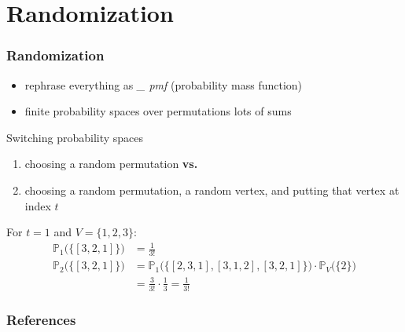 \documentclass{beamer}
\begin{document}

\section{Randomization}
\begin{frame}
  \frametitle{Randomization}
  \begin{itemize}[<+->]
    \item rephrase everything as \emph{\_ pmf} (probability mass function)
    \item finite probability spaces over permutations \textrightarrow{} lots of sums
  \end{itemize}
  \onslide<+->
  \begin{alertblock}{Switching probability spaces}
    \begin{enumerate}[<+->]
      \item choosing a random permutation \textbf{vs.}
      
      \item choosing a random permutation, a random vertex, and putting that vertex at index $t$
    \end{enumerate}
    \onslide<+->
    For $t = 1$ and $V = \{1,2,3\}$:
    \begin{align*}
      \mathbb{P}_1\Big(\big\{[3,2,1]\big\}\Big) &= \frac{1}{3!} \\
      \mathbb{P}_2\Big(\big\{[3,2,1]\big\}\Big) &= \mathbb{P}_1\Big(\big\{[2,3,1], [3,1,2], [3,2,1]\big\}\Big) 
        \cdot \mathbb{P}_V\big(\{2\}\big) \\
        &= \frac{3}{3!} \cdot \frac{1}{3} = \frac{1}{3!}
    \end{align*}
  \end{alertblock}
\end{frame}

\begin{frame}
  \frametitle{References}
  
  \nocite{github-repo}
  
  
\end{frame}
\end{document}
